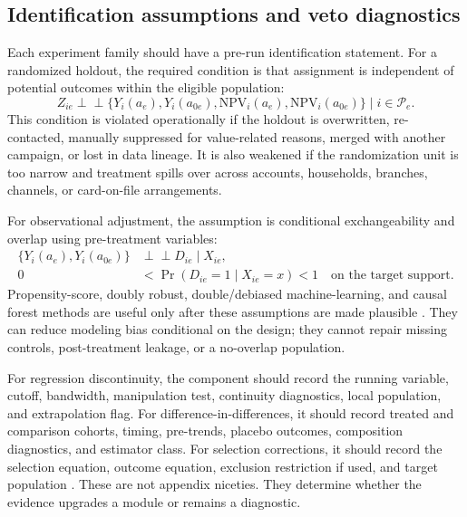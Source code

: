 \documentclass[11pt]{article}
\newcommand{\NPV}{\mathrm{NPV}}
\newcommand{\1}{\mathbf{1}}
\begin{document}
\subsection{Identification assumptions and veto diagnostics}

Each experiment family should have a pre-run identification statement. For a
randomized holdout, the required condition is that assignment is independent of
potential outcomes within the eligible population:
\begin{equation}
  Z_{ie}
  \perp\!\!\!\perp
  \{Y_i(a_e),Y_i(a_{0e}),\NPV_i(a_e),\NPV_i(a_{0e})\}
  \mid i\in\mathcal{P}_e.
  \label{eq:randomization-assumption}
\end{equation}
This condition is violated operationally if the holdout is overwritten,
re-contacted, manually suppressed for value-related reasons, merged with
another campaign, or lost in data lineage. It is also weakened if the
randomization unit is too narrow and treatment spills over across accounts,
households, branches, channels, or card-on-file arrangements.

For observational adjustment, the assumption is conditional exchangeability
and overlap using pre-treatment variables:
\begin{align}
  \{Y_i(a_e),Y_i(a_{0e})\} &\perp\!\!\!\perp D_{ie}\mid X_{ie}, \\
  0 &< \Pr(D_{ie}=1\mid X_{ie}=x) < 1
      \quad \text{on the target support}.
      \label{eq:overlap-assumption}
\end{align}
Propensity-score, doubly robust, double/debiased machine-learning, and causal
forest methods are useful only after these assumptions are made plausible
\citep{rosenbaum1983propensity,imbenswooldridge2009recent,
chernozhukov2018dml,wager2018causalforests}. They can reduce modeling bias
conditional on the design; they cannot repair missing controls, post-treatment
leakage, or a no-overlap population.

For regression discontinuity, the component should record the running
variable, cutoff, bandwidth, manipulation test, continuity diagnostics, local
population, and extrapolation flag. For difference-in-differences, it should
record treated and comparison cohorts, timing, pre-trends, placebo outcomes,
composition diagnostics, and estimator class. For selection corrections, it
should record the selection equation, outcome equation, exclusion restriction
if used, and target population \citep{heckman1979selection}. These are not
appendix niceties. They determine whether the evidence upgrades a module or
remains a diagnostic.
\end{document}
